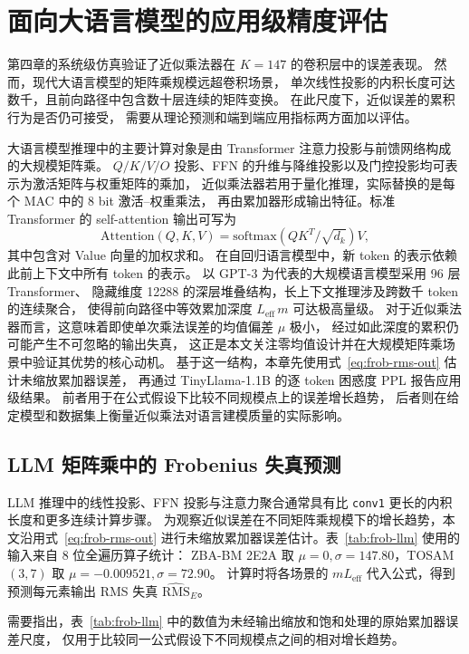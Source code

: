 \documentclass[12pt,a4paper,UTF8]{article}
\begin{document}
\clearpage
\section{面向大语言模型的应用级精度评估}
\label{sec:experiments}

第四章的系统级仿真验证了近似乘法器在 $K{=}147$ 的卷积层中的误差表现。
然而，现代大语言模型的矩阵乘规模远超卷积场景，
单次线性投影的内积长度可达数千，且前向路径中包含数十层连续的矩阵变换。
在此尺度下，近似误差的累积行为是否仍可接受，
需要从理论预测和端到端应用指标两方面加以评估。

大语言模型推理中的主要计算对象是由 Transformer 注意力投影与前馈网络构成的大规模矩阵乘。
$Q/K/V/O$ 投影、FFN 的升维与降维投影以及门控投影均可表示为激活矩阵与权重矩阵的乘加，
近似乘法器若用于量化推理，实际替换的是每个 MAC 中的 $8$ bit 激活--权重乘法，
再由累加器形成输出特征。标准 Transformer 的 self-attention 输出可写为
\[
\mathrm{Attention}(Q,K,V)=\mathrm{softmax}(QK^{T}/\sqrt{d_k})V,
\]
其中包含对 Value 向量的加权求和\cite{vaswani2017attention}。
在自回归语言模型中，新 token 的表示依赖此前上下文中所有 token 的表示。
以 GPT-3\cite{brown2020language} 为代表的大规模语言模型采用 96 层 Transformer、
隐藏维度 12288 的深层堆叠结构，长上下文推理涉及跨数千 token 的连续聚合，
使得前向路径中等效累加深度 $L_{\mathrm{eff}}\,m$ 可达极高量级。
对于近似乘法器而言，这意味着即使单次乘法误差的均值偏差 $\mu$ 极小，
经过如此深度的累积仍可能产生不可忽略的输出失真，
这正是本文关注零均值设计并在大规模矩阵乘场景中验证其优势的核心动机。
基于这一结构，本章先使用式~\eqref{eq:frob-rms-out} 估计未缩放累加器误差，
再通过 TinyLlama-1.1B 的逐 token 困惑度 PPL 报告应用级结果。
前者用于在公式假设下比较不同规模点上的误差增长趋势，
后者则在给定模型和数据集上衡量近似乘法对语言建模质量的实际影响。

\subsection{LLM 矩阵乘中的 Frobenius 失真预测}
\label{subsec:llm-frobenius}

LLM 推理中的线性投影、FFN 投影与注意力聚合通常具有比 \texttt{conv1} 更长的内积长度和更多连续计算步骤。
为观察近似误差在不同矩阵乘规模下的增长趋势，本文沿用式~\eqref{eq:frob-rms-out}
进行未缩放累加器误差估计。表~\ref{tab:frob-llm} 使用的输入来自 8 位全遍历算子统计：
ZBA-BM 2E2A 取 $\mu=0,\sigma=147.80$，TOSAM$(3,7)$ 取 $\mu=-0.009521,\sigma=72.90$。
计算时将各场景的 $mL_{\mathrm{eff}}$ 代入公式，得到预测每元素输出 RMS 失真
$\widehat{\mathrm{RMS}}_{\!E}$。

需要指出，表~\ref{tab:frob-llm} 中的数值为未经输出缩放和饱和处理的原始累加器误差尺度，
仅用于比较同一公式假设下不同规模点之间的相对增长趋势。
\end{document}
